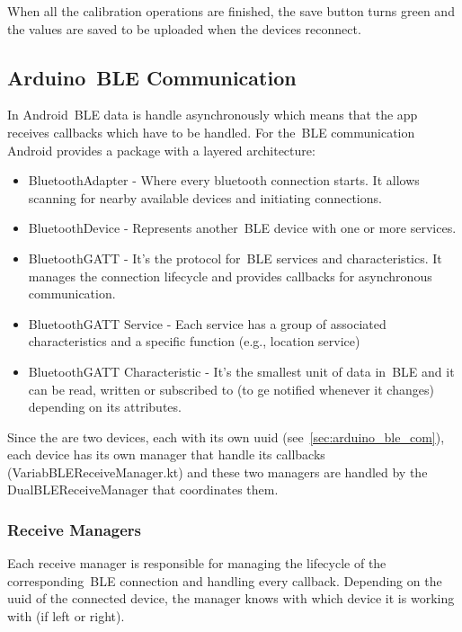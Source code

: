 When all the calibration operations are finished, the save button turns green and the values are saved to be uploaded when the devices reconnect.


\subsection{Arduino~\gls{BLE} Communication}
\label{ssec:android_com_arduino}

In Android~\gls{BLE} data is handle asynchronously which means that the app receives callbacks which have to be handled. For the~\gls{BLE} communication Android provides a package with a layered architecture:

\begin{itemize}
  \item BluetoothAdapter - Where every bluetooth connection starts. It allows scanning for nearby available devices and initiating connections.
  \item BluetoothDevice - Represents another~\gls{BLE}  device with one or more services.
  \item Bluetooth\gls{GATT} - It's the protocol for~\gls{BLE}  services and characteristics. It manages the connection lifecycle and provides callbacks for asynchronous communication.
  \item Bluetooth\gls{GATT} Service - Each service has a group of associated characteristics and a specific function (e.g., location service)
  \item Bluetooth\gls{GATT} Characteristic - It's the smallest unit of data in~\gls{BLE} and it can be read, written or subscribed to (to ge notified whenever it changes) depending on its attributes.
\end{itemize}

Since the are two devices, each with its own uuid (see~\autoref{sec:arduino_ble_com}), each device has its own manager that handle its callbacks (VariabBLEReceiveManager.kt) and these two managers are handled by the DualBLEReceiveManager 
that coordinates them. 


\subsubsection{Receive Managers}
\label{sssec:manager}

Each receive manager is responsible for managing the lifecycle of the corresponding~\gls{BLE} connection and handling every callback. Depending on the uuid of the connected device, the manager knows with which device it is working with 
(if left or right). 

